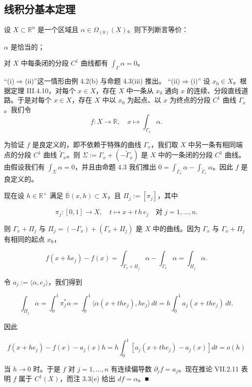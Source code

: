 \subsection*{线积分基本定理}

\begin{theorem}

设 $ X\subset\mathbb{R}^{n} $ 是一个区域且 $ \alpha \in \Omega_{(0)}(X) $。则下列断言等价：

\begin{subitems}
\item

$ \alpha $ 是恰当的；

\item

对 $ X $ 中每条闭的分段 $ C^1 $ 曲线都有 $ \int_{\Gamma}\alpha=0 $。

\proofhead
“(i)$ \Rightarrow $(ii)”这一情形由例 4.2(b) 与命题 4.3(iii) 推出。
“(ii)$ \Rightarrow $(i)” 设 $ x_0 \in X $。根据定理 III.4.10，对每个 $ x \in X $，存在 $ X $ 中一条从 $ x_0 $ 通向 $ x $ 的连续、分段直线道路。于是对每个 $ x \in X $，存在 $ X $ 中以 $ x_0 $ 为起点、以 $ x $ 为终点的分段 $ C^1 $ 曲线 $ \Gamma_x $。我们令
\[
f : X\to\mathbb{R} ,\quad x\mapsto\int_{\Gamma_x}\alpha .
\]

为验证 $ f $ 是良定义的，即不依赖于特殊的曲线 $ \Gamma_x $，我们取 $ X $ 中另一条有相同端点的分段 $ C^1 $ 曲线 $ \tilde{\Gamma}_x $。则 $ \Sigma:=\Gamma_x+(-\tilde{\Gamma}_x) $ 是 $ X $ 中的一条闭的分段 $ C^1 $ 曲线。由假设我们有 $ \int_{\Sigma}\alpha=0 $，并且由命题 4.3 我们推出 $ 0=\int_{\Gamma_x}\alpha-\int_{\tilde{\Gamma}_x}\alpha $。因此 $ f $ 是良定义的。

\end{subitems}


现在设 $ h \in \mathbb{R}^{+} $ 满足 $ \overline{\mathbb{B}}(x, h)\subset X $，且 $ \Pi_j:=[\pi_j] $，其中

\[
\pi_j : [0, 1]\to X ,\quad t\mapsto x+t\,h\,e_j\quad\text{对 }j=1,\ldots,n .
\]

则 $ \Gamma_x+\Pi_j $ 与 $ \Pi_j=(-\Gamma_x)+(\Gamma_x+\Pi_j) $ 是 $ X $ 中的曲线。因为 $ \Gamma_x $ 与 $ \Gamma_x+\Pi_j $ 有相同的起点 $ x_0 $，

\[
f(x+he_j)-f(x)=\int_{\Gamma_x+\Pi_j}\alpha-\int_{\Gamma_x}\alpha=\int_{\Pi_j}\alpha .
\]

令 $ a_j:=\langle\alpha, e_j\rangle $，我们得到

\[
\int_{\Pi_j}\alpha=\int_0^1\pi_j^{*}\alpha=\int_0^1\langle\alpha(x+the_j), he_j\rangle\,dt=h\int_0^1 a_j(x+the_j)\,dt .
\]

因此

\[
f(x+he_j)-f(x)-a_j(x)h=h\int_0^1\left[a_j(x+the_j)-a_j(x)\right]dt=o(h)
\]

当 $ h\to 0 $ 时。于是 $ f $ 对 $ j=1,\ldots,n $ 有连续偏导数 $ \partial_j f=a_j $。现在推论 VII.2.11 表明 $ f $ 属于 $ C^1(X) $，而注 3.3(e) 给出 $ df=\alpha $。\nobreak\hspace{0.35em}■

\end{theorem}

